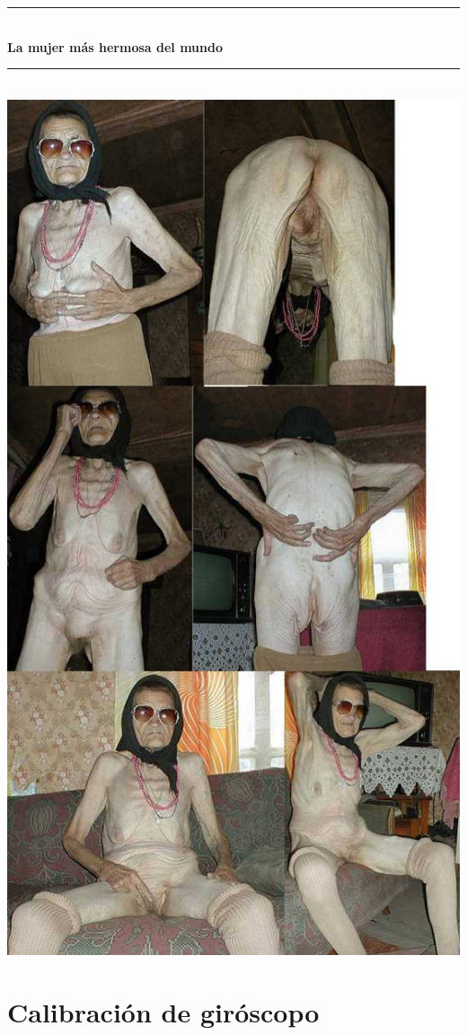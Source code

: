 \documentclass[spanish,12pt,a4paper,titlepage]{report}
\newcommand{\HRule}{\rule{\linewidth}{0.5mm}}
\begin{document}
\begin{titlepage}
\begin{center}
\HRule \\[0.4cm]
{ \huge \bfseries La mujer más hermosa del mundo}\\[0.4cm]
\HRule \\[2.5cm]
\includegraphics[width=.7\textwidth]{./pics/19.jpg}\\[1cm]
\vfill
\end{center}
\end{titlepage}

\chapter{Calibración de giróscopo}
\end{document}
